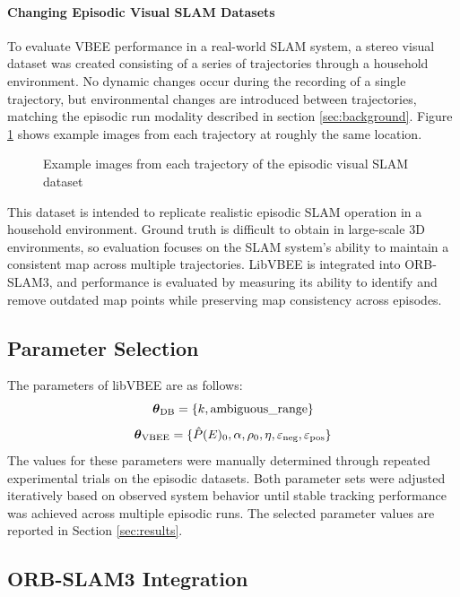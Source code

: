 \paragraph{Changing Episodic Visual SLAM Datasets}
To evaluate VBEE performance in a real-world SLAM system, a stereo visual dataset was created consisting of a series of trajectories through a household environment. No dynamic changes occur during the recording of a single trajectory, but environmental changes are introduced between trajectories, matching the episodic run modality described in section \ref{sec:background}. Figure \ref{fig:episodic_datasets} shows example images from each trajectory at roughly the same location.

\begin{figure}[H]
    \centering
    \caption{Example images from each trajectory of the episodic visual SLAM dataset}
    \label{fig:episodic_datasets}
\end{figure}

This dataset is intended to replicate realistic episodic SLAM operation in a household environment. Ground truth is difficult to obtain in large-scale 3D environments, so evaluation focuses on the SLAM system's ability to maintain a consistent map across multiple trajectories. LibVBEE is integrated into ORB-SLAM3, and performance is evaluated by measuring its ability to identify and remove outdated map points while preserving map consistency across episodes.

\subsection{Parameter Selection}
\label{sec:param_optimization}

The parameters of libVBEE are as follows:
$$\boldsymbol{\theta}_{\text{DB}} = \{k, \text{ambiguous\_range}\}$$
$$\boldsymbol{\theta}_{\text{VBEE}} = \{\hat{P}(E)_0, \alpha, \rho_0, \eta, \varepsilon_{\text{neg}}, \varepsilon_{\text{pos}}\}$$
The values for these parameters were manually determined through repeated experimental trials on the episodic datasets. Both parameter sets were adjusted iteratively based on observed system behavior until stable tracking performance was achieved across multiple episodic runs. The selected parameter values are reported in Section \ref{sec:results}.

\subsection{ORB-SLAM3 Integration}
\label{sec:orb_slam3_integration}


